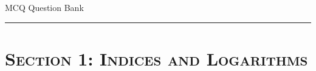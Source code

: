 \documentclass[10pt,a4paper]{article}
\newcommand{\topic}[1]{\section*{\large\textsc{#1}}}
\begin{document}
\begin{center}
    {\large MCQ Question Bank}\\[0.2em]
\end{center}

\vspace{0.5em}
\hrule
\vspace{1em}

\topic{Section 1: Indices and Logarithms}
\end{document}
